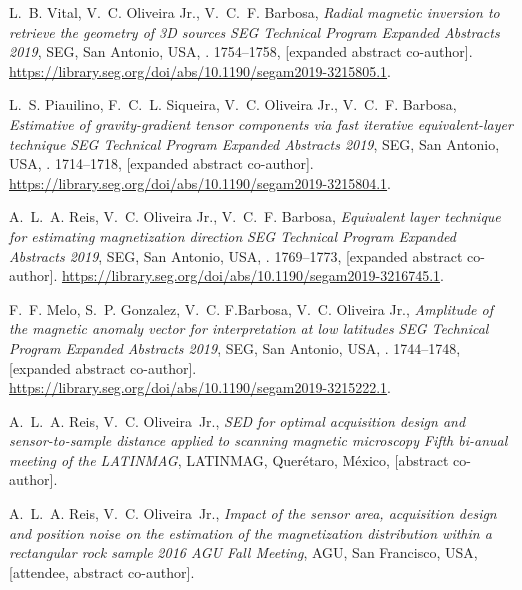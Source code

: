 
\nocite{*}

%
\begin{thebibliography}{10}

L.~B. Vital, V.~C. Oliveira{ }Jr., V.~C.~F. Barbosa, \emph{Radial magnetic
  inversion to retrieve the geometry of 3D sources} \bblin{} \emph{SEG
  Technical Program Expanded Abstracts 2019}, SEG, San Antonio, USA, \bblpp{}.
  1754--1758, [expanded abstract co-author].
  \urlprefix\url{https://library.seg.org/doi/abs/10.1190/segam2019-3215805.1}.

L.~S. Piauilino, F.~C.~L. Siqueira, V.~C. Oliveira{ }Jr., V.~C.~F. Barbosa,
  \emph{Estimative of gravity-gradient tensor components via fast iterative
  equivalent-layer technique} \bblin{} \emph{SEG Technical Program Expanded
  Abstracts 2019}, SEG, San Antonio, USA, \bblpp{}. 1714--1718, [expanded
  abstract co-author].
  \urlprefix\url{https://library.seg.org/doi/abs/10.1190/segam2019-3215804.1}.

A.~L.~A. Reis, V.~C. Oliveira{ }Jr., V.~C.~F. Barbosa, \emph{Equivalent layer
  technique for estimating magnetization direction} \bblin{} \emph{SEG
  Technical Program Expanded Abstracts 2019}, SEG, San Antonio, USA, \bblpp{}.
  1769--1773, [expanded abstract co-author].
  \urlprefix\url{https://library.seg.org/doi/abs/10.1190/segam2019-3216745.1}.

F.~F. Melo, S.~P. Gonzalez, V.~C. F.Barbosa, V.~C. Oliveira{ }Jr.,
  \emph{Amplitude of the magnetic anomaly vector for interpretation at low
  latitudes} \bblin{} \emph{SEG Technical Program Expanded Abstracts 2019},
  SEG, San Antonio, USA, \bblpp{}. 1744--1748, [expanded abstract co-author].
  \urlprefix\url{https://library.seg.org/doi/abs/10.1190/segam2019-3215222.1}.

A.~L.~A. Reis, V.~C. Oliveira~Jr., \emph{SED for optimal acquisition design and
  sensor-to-sample distance applied to scanning magnetic microscopy} \bblin{}
  \emph{Fifth bi-anual meeting of the LATINMAG}, LATINMAG, Quer\'{e}taro,
  M\'{e}xico, [abstract co-author].

A.~L.~A. Reis, V.~C. Oliveira~Jr., \emph{Impact of the sensor area, acquisition
  design and position noise on the estimation of the magnetization distribution
  within a rectangular rock sample} \bblin{} \emph{2016 AGU Fall Meeting}, AGU,
  San Francisco, USA, [attendee, abstract co-author].


\end{thebibliography}
